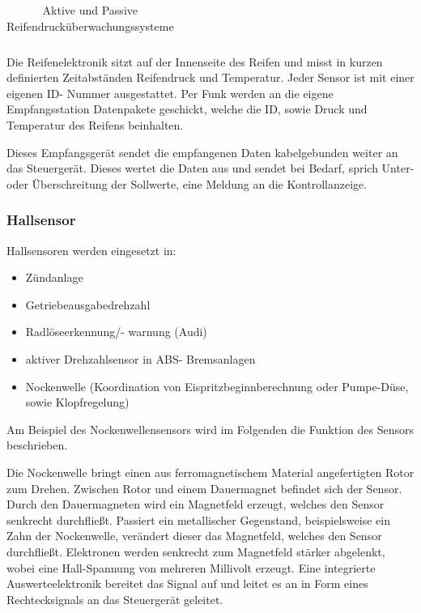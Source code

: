 \begin{flushleft}
\begin{table}
\begin{tabularx}{\textwidth} {l|l}
	                    \end{tabularx}
	                    \caption{Aktive und Passive Reifendrucküberwachungssysteme \cite{TS_rdks}}
	                    \label{fig:TS08}
	
	                \end{table}
	
	                
	                Die Reifenelektronik sitzt auf der Innenseite des Reifen und misst in kurzen definierten Zeitabständen Reifendruck und Temperatur. 
	                Jeder Sensor ist mit einer eigenen ID- Nummer ausgestattet. Per Funk werden an die eigene Empfangsstation Datenpakete geschickt, welche die ID, sowie Druck und Temperatur des Reifens beinhalten.
	
	                Dieses Empfangsgerät sendet die empfangenen Daten kabelgebunden weiter an das Steuergerät. Dieses wertet die Daten aus und sendet bei Bedarf, sprich Unter- oder Überschreitung der Sollwerte, eine Meldung an die Kontrollanzeige.
					
	                \subsubsection{Hallsensor}
	
					Hallsensoren werden eingesetzt in: 
					\begin{itemize}
						\item Zündanlage
						\item Getriebeausgabedrehzahl
						\item Radlöseerkennung/- warnung (Audi)
						\item aktiver Drehzahlsensor in ABS- Bremsanlagen
						\item Nockenwelle (Koordination von Eispritzbeginnberechnung oder Pumpe-Düse, sowie Klopfregelung)
					\end{itemize}
					
	                Am Beispiel des Nockenwellensensors wird im Folgenden die Funktion des Sensors beschrieben.
	                
	                Die Nockenwelle bringt einen aus ferromagnetischem Material angefertigten Rotor zum Drehen. Zwischen Rotor und einem Dauermagnet befindet sich der Sensor.
	                Durch den Dauermagneten wird ein Magnetfeld erzeugt, welches den Sensor senkrecht durchfließt. Passiert ein metallischer Gegenstand, beispielsweise ein Zahn der Nockenwelle, verändert dieser das Magnetfeld, welches den Sensor durchfließt.
					Elektronen werden senkrecht zum Magnetfeld stärker abgelenkt, wobei eine Hall-Spannung von mehreren Millivolt erzeugt. Eine integrierte Auswerteelektronik bereitet das Signal auf und leitet es an in Form eines Rechtecksignals an das Steuergerät geleitet. \cite{TS_hall}
	

\end{flushleft}
